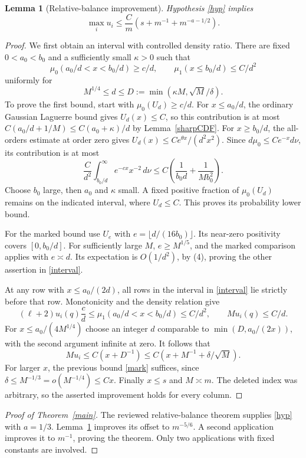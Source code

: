 \documentclass[11pt]{article}
\newtheorem{lemma}{Lemma}
\begin{document}
\begin{lemma}[Relative-balance improvement]\label{step}
Hypothesis \eqref{hyp} implies
\[
 \max_i u_i\le\frac C m
          \left(s+m^{-1}+m^{-a-1/2}\right).
\]
\end{lemma}
\begin{proof}
We first obtain an interval with controlled density ratio. There are
fixed $0<a_0<b_0$ and a sufficiently small $\kappa>0$ such that
\begin{equation}\label{interval}
 \mu_0(a_0/d<x<b_0/d)\ge c/d,\qquad
 \mu_1(x\le b_0/d)\le C/d^2
\end{equation}
uniformly for
\[
 M^{1/4}\le d\le D:=\min(\kappa M,\sqrt M/\delta).
\]
To prove the first bound, start with $\mu_0(U_d)\ge c/d$.
For $x\le a_0/d$, the ordinary Gaussian Laguerre bound gives
$U_d(x)\le C$, so this contribution is at most
$C(a_0/d+1/M)\le C(a_0+\kappa)/d$ by Lemma~\ref{sharpCDF}.
For $x\ge b_0/d$, the all-orders estimate at order zero gives
$U_d(x)\le C e^{\theta x}/(d^2x^2)$. Since
$d\mu_0\le C e^{-x}d\nu$, its contribution is at most
\[
 \frac C{d^2}\int_{b_0/d}^\infty e^{-cx}x^{-2}\,d\nu
 \le C\left(\frac1{b_0d}+\frac1{Mb_0^2}\right).
\]
Choose $b_0$ large, then $a_0$ and $\kappa$ small. A fixed positive
fraction of $\mu_0(U_d)$ remains on the indicated interval, where
$U_d\le C$. This proves its probability lower bound.

For the marked bound use $U_e$ with
$e=\lfloor d/(16b_0)\rfloor$. Its near-zero positivity covers
$[0,b_0/d]$. For sufficiently large $M$, $e\ge M^{1/5}$, and the
marked comparison applies with $e\asymp d$. Its expectation is
$O(1/d^2)$, by (4), proving the other assertion in \eqref{interval}.

At any row with $x\le a_0/(2d)$, all rows in the interval
in \eqref{interval} lie strictly before that row. Monotonicity and
the density relation give
\[
 (\ell+2)u_i(q)\frac c d
 \le\mu_1(a_0/d<x<b_0/d)\le C/d^2,
 \qquad M u_i(q)\le C/d.
\]
For $x\le a_0/(4M^{1/4})$ choose an integer $d$ comparable to
$\min(D,a_0/(2x))$, with the second argument infinite at zero.
It follows that
\[
 M u_i\le C(x+D^{-1})
       \le C(x+M^{-1}+\delta/\sqrt M).
\]
For larger $x$, the previous bound \eqref{mark} suffices, since
$\delta\le M^{-1/3}=o(M^{-1/4})\le Cx$.
Finally $x\le s$ and $M\asymp m$. The deleted index was arbitrary,
so the asserted improvement holds for every column.
\end{proof}

\begin{proof}[Proof of Theorem~\ref{main}]
The reviewed relative-balance theorem supplies \eqref{hyp} with
$a=1/3$. Lemma~\ref{step} improves its offset to $m^{-5/6}$.
A second application improves it to $m^{-1}$, proving the theorem.
Only two applications with fixed constants are involved.
\end{proof}
\end{document}
